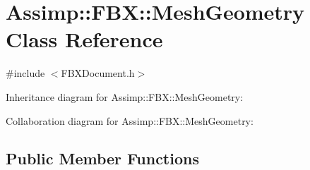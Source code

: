 \hypertarget{class_assimp_1_1_f_b_x_1_1_mesh_geometry}{\section{Assimp\+:\+:F\+B\+X\+:\+:Mesh\+Geometry Class Reference}
\label{class_assimp_1_1_f_b_x_1_1_mesh_geometry}
}


{\ttfamily \#include $<$F\+B\+X\+Document.\+h$>$}



Inheritance diagram for Assimp\+:\+:F\+B\+X\+:\+:Mesh\+Geometry\+:


Collaboration diagram for Assimp\+:\+:F\+B\+X\+:\+:Mesh\+Geometry\+:
\subsection*{Public Member Functions}
